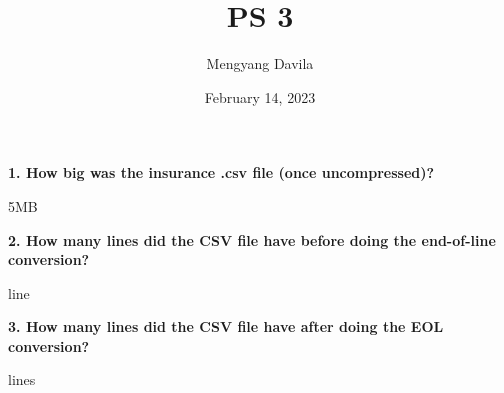 \documentclass{article}
\title{PS 3}
\author{Mengyang Davila}
\date{February 14, 2023}
\begin{document}
\maketitle
\textbf{1. How big was the insurance .csv file (once uncompressed)?}

\indent 5MB

\textbf{2. How many lines did the CSV file have before doing the end-of-line conversion?}

 line

\textbf{3. How many lines did the CSV file have after doing the EOL conversion?}

 lines
\end{document}
